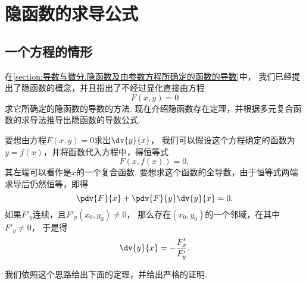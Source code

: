 \section{隐函数的求导公式}
\subsection{一个方程的情形}
在\cref{section:导数与微分.隐函数及由参数方程所确定的函数的导数}中，
我们已经提出了隐函数的概念，并且指出了不经过显化直接由方程\begin{equation*}
	F(x,y) = 0
\end{equation*}求它所确定的隐函数的导数的方法.
现在介绍隐函数存在定理，并根据多元复合函数的求导法推导出隐函数的导数公式.

要想由方程\(F(x,y)=0\)求出\(\dv{y}{x}\)，
我们可以假设这个方程确定的函数为\(y=f(x)\)，并将函数代入方程中，得恒等式\begin{equation*}
	F(x,f(x))=0,
\end{equation*}
其左端可以看作是\(x\)的一个复合函数.
要想求这个函数的全导数，由于恒等式两端求导后仍然恒等，即得\begin{equation*}
	\pdv{F}{x}+\pdv{F}{y}\dv{y}{x}=0.
\end{equation*}
如果\(F'_y\)连续，且\(F'_y(x_0,y_0)\neq0\)，
那么存在\((x_0,y_0)\)的一个邻域，在其中\(F'_y\neq0\)，
于是得\begin{equation*}
	\dv{y}{x}=-\frac{F'_x}{F'_y}.
\end{equation*}

我们依照这个思路给出下面的定理，并给出严格的证明.

